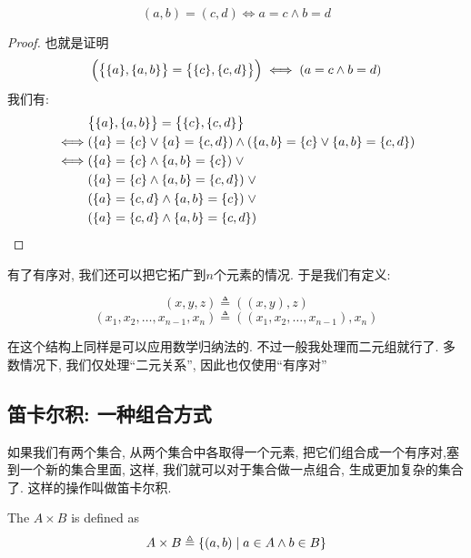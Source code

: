 \begin{theorem}
    \[
      (a, b) = (c, d) \iff a = c \land b = d
    \]
\end{theorem}
\begin{proof}
    也就是证明
    $$\Big(\big\{\{a\}, \{a, b\}\big\} = \big\{\{c\}, \{c, d\}\big\}\Big) \iff (a = c \land b = d)$$
    我们有: 
    \begin{align*}
        &\big\{\{a\}, \{a, b\}\big\} = \big\{\{c\}, \{c, d\}\big\} \\
        \iff& (\{a\} = \{c\} \lor \{a\} = \{c, d\}) \land (\{a, b\} = \{c\} \lor \{a, b\} = \{c, d\}) \\
        \iff& (\{a\} = \{c\} \land \{a, b\} = \{c\}) \;\lor \\
                         & (\{a\} = \{c\} \land \{a, b\} = \{c, d\}) \;\lor \\
                         & (\{a\} = \{c, d\} \land \{a, b\} = \{c\}) \;\lor \\
                         & (\{a\} = \{c, d\} \land \{a, b\} = \{c, d\})
      \end{align*}
    

\end{proof}

有了有序对, 我们还可以把它拓广到$n$个元素的情况. 于是我们有定义: 

\begin{definition}
    \[
      (x, y, z) \triangleq ((x, y), z)
    \]
    \[
      (x_{1}, x_{2}, \dots, x_{n-1}, x_{n})
        \triangleq ((x_{1}, x_{2}, \dots, x_{n-1}), x_{n})
    \]
\end{definition}

在这个结构上同样是可以应用数学归纳法的. 不过一般我处理而二元组就行了. 多数情况下, 我们仅处理``二元关系'', 因此也仅使用``有序对''

\subsection{笛卡尔积: 一种组合方式}

如果我们有两个集合, 从两个集合中各取得一个元素, 把它们组合成一个有序对,塞到一个新的集合里面, 这样, 我们就可以对于集合做一点组合, 生成更加复杂的集合了. 这样的操作叫做笛卡尔积.  

\begin{definition}
    The  $A \times B$ 
    is defined as
    \[
      {A \times B \triangleq \{(a, b) \mid a \in A \land b \in B\}}
    \]
\end{definition}

